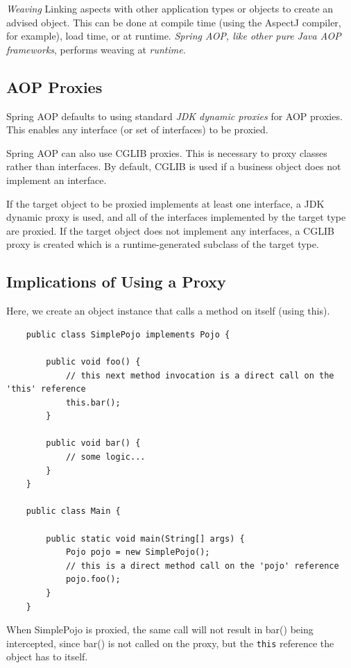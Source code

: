 \documentclass{scrartcl}
\begin{document}
\textit{Weaving}
Linking aspects with other application types or objects to create an advised object. This can be done at compile time (using the AspectJ compiler, for example), load time, or at runtime. \textit{Spring AOP, like other pure Java AOP frameworks}, performs weaving at \textit{runtime}.

\subsection{AOP Proxies}

Spring AOP defaults to using standard\textit{ JDK dynamic proxies} for AOP proxies. This enables any interface (or set of interfaces) to be proxied.

Spring AOP can also use CGLIB proxies. This is necessary to proxy classes rather than interfaces. By default, CGLIB is used if a business object does not implement an interface.

If the target object to be proxied implements at least one interface, a JDK dynamic proxy is used, and all of the interfaces implemented by the target type are proxied. If the target object does not implement any interfaces, a CGLIB proxy is created which is a runtime-generated subclass of the target type.

\subsection{Implications of Using a Proxy}

Here, we create an object instance that calls a method on itself (using this).

\begin{lstlisting}
    public class SimplePojo implements Pojo {

        public void foo() {
            // this next method invocation is a direct call on the 'this' reference
            this.bar();
        }

        public void bar() {
            // some logic...
        }
    }

    public class Main {

        public static void main(String[] args) {
            Pojo pojo = new SimplePojo();
            // this is a direct method call on the 'pojo' reference
            pojo.foo();
        }
    }
\end{lstlisting}

When SimplePojo is proxied, the same call will not result in bar() being intercepted, since bar() is not called on the proxy, but the \lstinline[]|this| reference the object has to itself.
\end{document}

